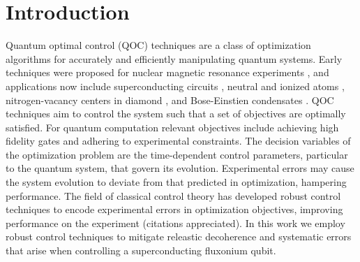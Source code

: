 \documentclass[
  amsfonts,
  amsmath,
  tbtags,
  amssymb,
  aps,
  nobibnotes,
  twocolumn,
  superscriptaddress,
]{revtex4-2}
\begin{document}
\section{Introduction}
Quantum optimal control (QOC) techniques are a class of optimization
algorithms for accurately and efficiently manipulating quantum systems.
Early techniques were proposed for nuclear magnetic resonance experiments
\cite{khaneja2005optimal}, and applications now include superconducting
circuits \cite{heeres2017implementing,
  huang2020engineering, leng2019robust, leung2017speedup, xu2020nonadiabatic},
neutral and ionized atoms \cite{van2016optimal}, nitrogen-vacancy centers in
diamond \cite{rembold2020introduction}, and Bose-Einstien condensates
\cite{sorensen2018quantum}. QOC techniques aim to control the system
such that a set of objectives are optimally satisfied.
For quantum computation relevant objectives include achieving high fidelity
gates and adhering to experimental constraints.
The decision variables of the optimization problem are the time-dependent control
parameters, particular to the quantum system, that govern its evolution.
Experimental errors may cause the system evolution to deviate from that predicted in
optimization, hampering performance.
The field of classical control theory has developed robust control techniques
to encode experimental errors in optimization objectives, improving
performance on the experiment (citations appreciated).
In this work we employ robust control techniques to mitigate
releastic decoherence and systematic errors that arise when controlling
a superconducting fluxonium qubit.
\end{document}
